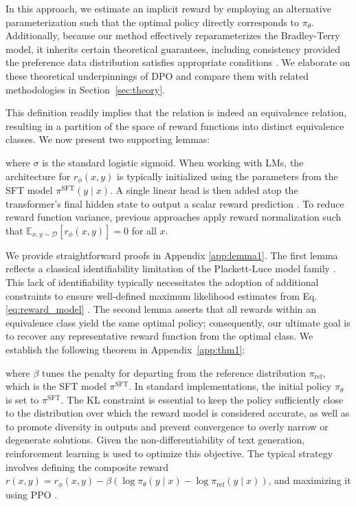 In this approach, we estimate an implicit reward by employing an alternative parameterization such that the optimal policy directly corresponds to $\pi_\theta$. Additionally, because our method effectively reparameterizes the Bradley-Terry model, it inherits certain theoretical guarantees, including consistency provided the preference data distribution satisfies appropriate conditions \cite{bong2022generalized}. We elaborate on these theoretical underpinnings of DPO and compare them with related methodologies in Section~\ref{sec:theory}.

This definition readily implies that the relation is indeed an equivalence relation, resulting in a partition of the space of reward functions into distinct equivalence classes. We now present two supporting lemmas:

where $\sigma$ is the standard logistic sigmoid. When working with LMs, the architecture for $r_{\phi}(x, y)$ is typically initialized using the parameters from the SFT model $\pi^\text{SFT}(y \mid x)$. A single linear head is then added atop the transformer’s final hidden state to output a scalar reward prediction \cite{ziegler2020finetuning}. To reduce reward function variance, previous approaches apply reward normalization such that  $\mathbb{E}_{x,y\sim \mathcal{D}}\left[r_\phi(x, y)\right] = 0$ for all $x$.

We provide straightforward proofs in Appendix \ref{app:lemma1}. The first lemma reflects a classical identifiability limitation of the Plackett-Luce model family \cite{plackett1975analysis}. This lack of identifiability typically necessitates the adoption of additional constraints to ensure well-defined maximum likelihood estimates from Eq. \ref{eq:reward_model} \cite{bong2022generalized}. The second lemma asserts that all rewards within an equivalence class yield the same optimal policy; consequently, our ultimate goal is to recover any representative reward function from the optimal class. We establish the following theorem in Appendix~\ref{app:thm1}:

where $\beta$ tunes the penalty for departing from the reference distribution $\pi_\text{ref}$, which is the SFT model $\pi^\text{SFT}$. In standard implementations, the initial policy $\pi_\theta$ is set to $\pi^\text{SFT}$. The KL constraint is essential to keep the policy sufficiently close to the distribution over which the reward model is considered accurate, as well as to promote diversity in outputs and prevent convergence to overly narrow or degenerate solutions. Given the non-differentiability of text generation, reinforcement learning is used to optimize this objective. The typical strategy \citep{ziegler2020finetuning, stiennon2022learning, bai2022training, ouyang2022training} involves defining the composite reward ${r(x, y) = r_{\phi}(x, y) -\beta (\log \pi_{\theta}(y\mid x) - \log \pi_\text{ref}(y\mid x))}$, and maximizing it using PPO \cite{schulman2017proximal}.

